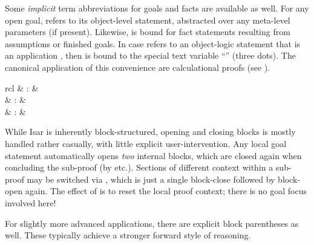 \begin{isabellebody}
\begin{isamarkuptext}
\begin{descr}
  \end{descr}

  Some \emph{implicit} term abbreviations
  for goals and facts are available as well.  For any open goal,
  \mbox{} refers to its object-level statement,
  abstracted over any meta-level parameters (if present).  Likewise,
  \mbox{} is bound for fact statements resulting from
  assumptions or finished goals.  In case \mbox{} refers to
  an object-logic statement that is an application , then
   is bound to the special text variable ``\mbox{\isa{{\isasymdots}}}''
  (three dots).  The canonical application of this convenience are
  calculational proofs (see ).%
\end{isamarkuptext}%
\isamarkuptrue%
%
\isamarkuptrue%
%
\begin{isamarkuptext}%
\begin{matharray}{rcl}
    \mbox{} & : &  \\
    \mbox{\isa{\isacommand{{\isacharbraceleft}}}} & : &  \\
    \mbox{\isa{\isacommand{{\isacharbraceright}}}} & : &  \\
  \end{matharray}

  While Isar is inherently block-structured, opening and closing
  blocks is mostly handled rather casually, with little explicit
  user-intervention.  Any local goal statement automatically opens
  \emph{two} internal blocks, which are closed again when concluding
  the sub-proof (by \mbox{} etc.).  Sections of different
  context within a sub-proof may be switched via \mbox{},
  which is just a single block-close followed by block-open again.
  The effect of \mbox{} is to reset the local proof context;
  there is no goal focus involved here!

  For slightly more advanced applications, there are explicit block
  parentheses as well.  These typically achieve a stronger forward
  style of reasoning.

  \begin{descr}


\end{descr}
\end{isamarkuptext}
\end{isabellebody}
